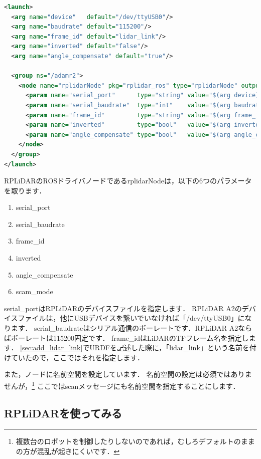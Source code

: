 \documentclass[{../../master}]{subfiles}
\begin{document}
\begin{lstlisting}[language=XML, label=code:rplidar_a2_launch, caption=\textsf{rplidar\_a2.launch}]
<launch>
  <arg name="device"   default="/dev/ttyUSB0"/>
  <arg name="baudrate" default="115200"/>
  <arg name="frame_id" default="lidar_link"/>
  <arg name="inverted" default="false"/>
  <arg name="angle_compensate" default="true"/>

  <group ns="/adamr2">
    <node name="rplidarNode" pkg="rplidar_ros" type="rplidarNode" output="screen">
      <param name="serial_port"      type="string" value="$(arg device)"/>
      <param name="serial_baudrate"  type="int"    value="$(arg baudrate)"/>
      <param name="frame_id"         type="string" value="$(arg frame_id)"/>
      <param name="inverted"         type="bool"   value="$(arg inverted)"/>
      <param name="angle_compensate" type="bool"   value="$(arg angle_compensate)"/>
    </node>
  </group>
</launch>
\end{lstlisting}

RPLiDARのROSドライバノードである\textsf{rplidarNode}は，以下の6つのパラメータを取ります．

\begin{enumerate}
  \item \textsf{serial\_port}
  \item \textsf{serial\_baudrate}
  \item \textsf{frame\_id}
  \item \textsf{inverted}
  \item \textsf{angle\_compensate}
  \item \textsf{scam\_mode}
\end{enumerate}

\textsf{serial\_port}はRPLiDARのデバイスファイルを指定します．
RPLiDAR A2のデバイスファイルは，他にUSBデバイスを繋いでいなければ「\textsf{/dev/ttyUSB0}」になります．
\textsf{serial\_baudrate}はシリアル通信のボーレートです．RPLiDAR A2ならばボーレートは115200固定です．
\textsf{frame\_id}はLiDARのTFフレーム名を指定します．
\ref{sec:add_lidar_link}でURDFを記述した際に，「\textsf{lidar\_link}」という名前を付けていたので，ここではそれを指定します．

また，ノードに名前空間を設定しています．
名前空間の設定は必須ではありませんが，\footnote{複数台のロボットを制御したりしないのであれば，むしろデフォルトのままの方が混乱が起きにくいです．}
ここでは\textsf{scan}メッセージにも名前空間を指定することにします．

\subsection{RPLiDARを使ってみる}
\end{document}
